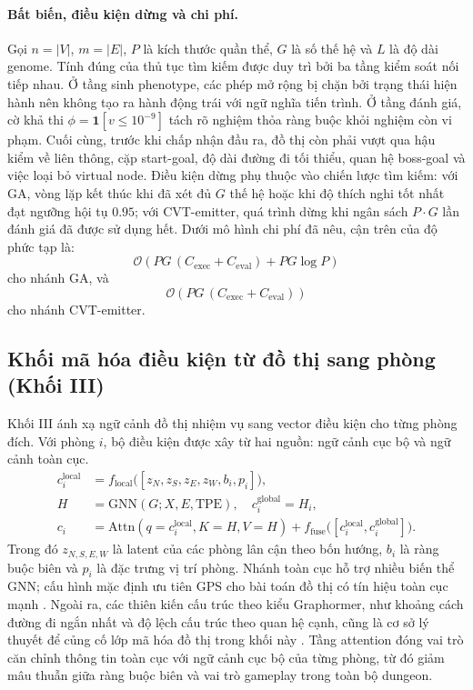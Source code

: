 \documentclass[oneside,a4paper,12pt]{extreport}
\begin{document}
\paragraph{Bất biến, điều kiện dừng và chi phí.}
Gọi $n=|V|$, $m=|E|$, $P$ là kích thước quần thể, $G$ là số thế hệ và $L$ là độ dài genome. Tính đúng của thủ tục tìm kiếm được duy trì bởi ba tầng kiểm soát nối tiếp nhau. Ở tầng sinh phenotype, các phép mở rộng bị chặn bởi trạng thái hiện hành nên không tạo ra hành động trái với ngữ nghĩa tiến trình. Ở tầng đánh giá, cờ khả thi $\phi=\mathbf{1}[v\le 10^{-9}]$ tách rõ nghiệm thỏa ràng buộc khỏi nghiệm còn vi phạm. Cuối cùng, trước khi chấp nhận đầu ra, đồ thị còn phải vượt qua hậu kiểm về liên thông, cặp start-goal, độ dài đường đi tối thiểu, quan hệ boss-goal và việc loại bỏ virtual node. Điều kiện dừng phụ thuộc vào chiến lược tìm kiếm: với GA, vòng lặp kết thúc khi đã xét đủ $G$ thế hệ hoặc khi độ thích nghi tốt nhất đạt ngưỡng hội tụ $0.95$; với CVT-emitter, quá trình dừng khi ngân sách $P\cdot G$ lần đánh giá đã được sử dụng hết. Dưới mô hình chi phí đã nêu, cận trên của độ phức tạp là:
\begin{equation}
\mathcal{O}\!\left(PG\,(C_{\text{exec}}+C_{\text{eval}})+PG\log P\right)
\end{equation}
cho nhánh GA, và
\begin{equation}
\mathcal{O}\!\left(PG\,(C_{\text{exec}}+C_{\text{eval}})\right)
\end{equation}
cho nhánh CVT-emitter.

\subsection{Khối mã hóa điều kiện từ đồ thị sang phòng (Khối III)}
Khối III ánh xạ ngữ cảnh đồ thị nhiệm vụ sang vector điều kiện cho từng phòng đích. Với phòng $i$, bộ điều kiện được xây từ hai nguồn: ngữ cảnh cục bộ và ngữ cảnh toàn cục.
\begin{align}
c_i^{\text{local}} &= f_{\text{local}}\big([z_{N}, z_{S}, z_{E}, z_{W}, b_i, p_i]\big),\\
H &= \mathrm{GNN}(G; X, E, \mathrm{TPE}), \quad c_i^{\text{global}} = H_i,\\
c_i &= \mathrm{Attn}(q=c_i^{\text{local}}, K=H, V=H) + f_{\text{fuse}}\big([c_i^{\text{local}}, c_i^{\text{global}}]\big).
\end{align}
Trong đó $z_{N,S,E,W}$ là latent của các phòng lân cận theo bốn hướng, $b_i$ là ràng buộc biên và $p_i$ là đặc trưng vị trí phòng. Nhánh toàn cục hỗ trợ nhiều biến thể GNN; cấu hình mặc định ưu tiên GPS cho bài toán đồ thị có tín hiệu toàn cục mạnh \cite{rampasek2022gps}. Ngoài ra, các thiên kiến cấu trúc theo kiểu Graphormer, như khoảng cách đường đi ngắn nhất và độ lệch cấu trúc theo quan hệ cạnh, cũng là cơ sở lý thuyết để củng cố lớp mã hóa đồ thị trong khối này \cite{ying2021graphormer}. Tầng attention đóng vai trò căn chỉnh thông tin toàn cục với ngữ cảnh cục bộ của từng phòng, từ đó giảm mâu thuẫn giữa ràng buộc biên và vai trò gameplay trong toàn bộ dungeon.
\end{document}
